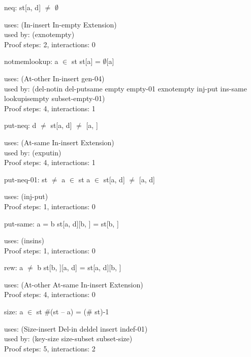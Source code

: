 \documentclass[a4paper]{article}
\begin{document}
\medskip

neq: 
 \Fol st[a, d] $\neq$ $\emptyset$


uses: (In-insert In-empty Extension)\\
used by: (exnotempty)\\
Proof steps: 2, interactions: 0

\medskip

notmemlookup: 
 \Fol \Not a $\in$ st \Imp st[a] = $\emptyset$[a]


uses: (At-other In-insert gen-04)\\
used by: (del-notin del-putsame empty empty-01 exnotempty inj-put
          ins-same lookupisempty subset-empty-01)\\
Proof steps: 4, interactions: 1

\medskip

put-neq: 
 \Fol d $\neq$  \Imp st[a, d] $\neq$ [a, ]


uses: (At-same In-insert Extension)\\
used by: (exputin)\\
Proof steps: 4, interactions: 1

\medskip

put-neq-01: 
 \Fol st $\neq$  \And \Not a $\in$ st \And \Not a $\in$  \Imp st[a, d] $\neq$ [a, d]


uses: (inj-put)\\
Proof steps: 1, interactions: 0

\medskip

put-same: 
 \Fol a = b \Imp st[a, d][b, ] = st[b, ]


uses: (insins)\\
Proof steps: 1, interactions: 0

\medskip

rew: 
 \Fol a $\neq$ b \Imp st[b, ][a, d] = st[a, d][b, ]


uses: (At-other At-same In-insert Extension)\\
Proof steps: 4, interactions: 0

\medskip

size: 
 \Fol a $\in$ st \Imp \#(st -- a) = (\# st)-1


uses: (Size-insert Del-in deldel insert indef-01)\\
used by: (key-size size-subset subset-size)\\
Proof steps: 5, interactions: 2

\medskip
\end{document}
